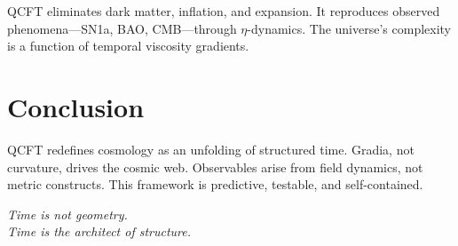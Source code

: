 \documentclass[12pt]{article}
\begin{document}
QCFT eliminates dark matter, inflation, and expansion. It reproduces observed phenomena---SN1a, BAO, CMB---through $\eta$-dynamics. The universe's complexity is a function of temporal viscosity gradients.

\section{Conclusion}

QCFT redefines cosmology as an unfolding of structured time. Gradia, not curvature, drives the cosmic web. Observables arise from field dynamics, not metric constructs. This framework is predictive, testable, and self-contained.

\begin{center}
\emph{Time is not geometry.\\
Time is the architect of structure.}
\end{center}
\end{document}
